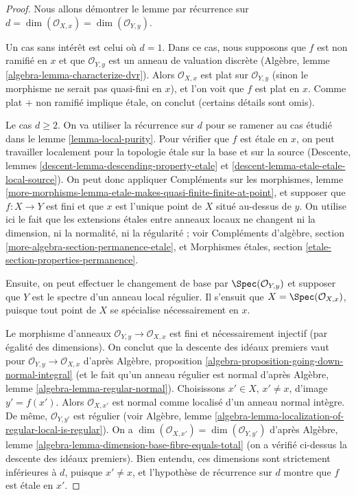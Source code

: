 \begin{proof}
Nous allons démontrer le lemme par récurrence sur
$d = \dim(\mathcal{O}_{X, x}) = \dim(\mathcal{O}_{Y, y})$.

\medskip\noindent
Un cas sans intérêt est celui où $d = 1$.
Dans ce cas, nous supposons que $f$ est non ramifié en $x$
et que $\mathcal{O}_{Y, y}$ est un anneau de valuation discrète
(Algèbre, lemme \ref{algebra-lemma-characterize-dvr}).
Alors $\mathcal{O}_{X, x}$ est plat sur $\mathcal{O}_{Y, y}$
(sinon le morphisme ne serait pas quasi-fini en $x$),
et l'on voit que $f$ est plat en $x$. Comme plat $+$
non ramifié implique étale, on conclut (certains détails sont omis).

\medskip\noindent
Le cas $d \geq 2$. On va utiliser la récurrence sur $d$ pour se ramener
au cas étudié dans le lemme \ref{lemma-local-purity}.
Pour vérifier que $f$ est étale en $x$, on peut travailler localement pour la topologie étale
sur la base et sur la source
(Descente, lemmes \ref{descent-lemma-descending-property-etale} et
\ref{descent-lemma-etale-etale-local-source}).
On peut donc appliquer Compléments sur les morphismes, lemme
\ref{more-morphisms-lemma-etale-makes-quasi-finite-finite-at-point},
et supposer que $f : X \to Y$ est fini et que $x$ est l'unique
point de $X$ situé au-dessus de $y$. On utilise ici le fait que les extensions étales entre
anneaux locaux ne changent ni la dimension, ni la normalité, ni la régularité ; voir
Compléments d'algèbre, section \ref{more-algebra-section-permanence-etale},
et
Morphismes étales, section \ref{etale-section-properties-permanence}.

\medskip\noindent
Ensuite, on peut effectuer le changement de base par $\Spec(\mathcal{O}_{Y, y})$
et supposer que $Y$ est le spectre d'un anneau local régulier.
Il s'ensuit que $X = \Spec(\mathcal{O}_{X, x})$, puisque
tout point de $X$ se spécialise nécessairement en $x$.

\medskip\noindent
Le morphisme d'anneaux $\mathcal{O}_{Y, y} \to \mathcal{O}_{X, x}$ est
fini et nécessairement injectif (par égalité des dimensions).
On conclut que la descente des idéaux premiers vaut pour
$\mathcal{O}_{Y, y} \to \mathcal{O}_{X, x}$ d'après
Algèbre, proposition \ref{algebra-proposition-going-down-normal-integral}
(et le fait qu'un anneau régulier est normal d'après
Algèbre, lemme \ref{algebra-lemma-regular-normal}).
Choisissons $x' \in X$, $x' \not = x$, d'image $y' = f(x')$.
Alors $\mathcal{O}_{X, x'}$ est normal comme localisé
d'un anneau normal intègre. De même, $\mathcal{O}_{Y, y'}$ est
régulier (voir Algèbre, lemme
\ref{algebra-lemma-localization-of-regular-local-is-regular}).
On a $\dim(\mathcal{O}_{X, x'}) = \dim(\mathcal{O}_{Y, y'})$ d'après
Algèbre, lemme \ref{algebra-lemma-dimension-base-fibre-equals-total}
(on a vérifié ci-dessus la descente des idéaux premiers).
Bien entendu, ces dimensions sont strictement inférieures à $d$, puisque $x' \not = x$,
et l'hypothèse de récurrence sur $d$ montre que $f$ est étale en $x'$.


\end{proof}
